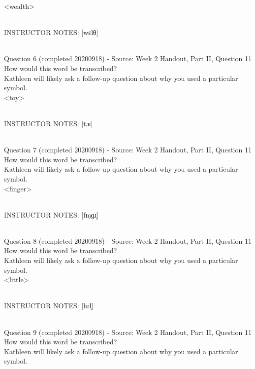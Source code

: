 \documentclass[12pt]{article}
\begin{document}
<wealth>


~\\
INSTRUCTOR NOTES: [wɛlθ]


~\\

{\large Question 6} (completed 20200918) - Source: Week 2 Handout, Part II, Question 11\\

How would this word be transcribed?\\ Kathleen will likely ask a follow-up question about why you used a particular symbol.\\

<toy>


~\\
INSTRUCTOR NOTES: [tɔɪ]


~\\

{\large Question 7} (completed 20200918) - Source: Week 2 Handout, Part II, Question 11\\

How would this word be transcribed?\\ Kathleen will likely ask a follow-up question about why you used a particular symbol.\\

<finger>


~\\
INSTRUCTOR NOTES: [fɪŋɡɹ̩]


~\\

{\large Question 8} (completed 20200918) - Source: Week 2 Handout, Part II, Question 11\\

How would this word be transcribed?\\ Kathleen will likely ask a follow-up question about why you used a particular symbol.\\

<little>


~\\
INSTRUCTOR NOTES: [lɪɾl̩]


~\\

{\large Question 9} (completed 20200918) - Source: Week 2 Handout, Part II, Question 11\\

How would this word be transcribed?\\ Kathleen will likely ask a follow-up question about why you used a particular symbol.\\
\end{document}
